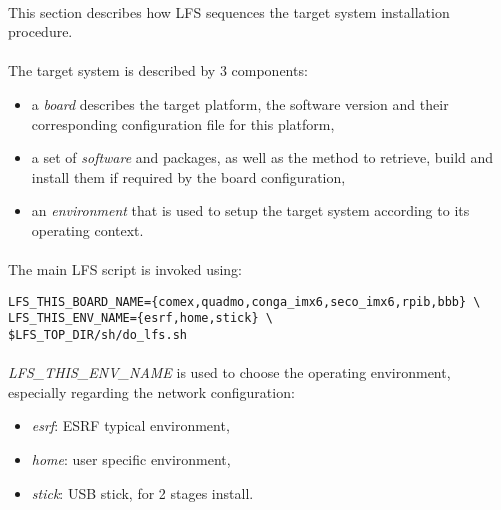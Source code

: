 \documentclass[a4paper, 11pt]{article}
\begin{document}
\paragraph{}
This section describes how LFS sequences the target system installation procedure.

\paragraph{}
The target system is described by 3 components:
\begin{itemize}
\item a \textit{board} describes the target platform, the software version and
their corresponding configuration file for this platform,
\item a set of \textit{software} and packages, as well as the method to retrieve,
build and install them if required by the board configuration,
\item an \textit{environment} that is used to setup the target system according
to its operating context.
\end{itemize}

\paragraph{}
The main LFS script is invoked using:\\

\begin{lstlisting}[frame=tb]
LFS_THIS_BOARD_NAME={comex,quadmo,conga_imx6,seco_imx6,rpib,bbb} \
LFS_THIS_ENV_NAME={esrf,home,stick} \
$LFS_TOP_DIR/sh/do_lfs.sh
\end{lstlisting}

\paragraph{}
\textit{LFS\_THIS\_ENV\_NAME} is used to choose the operating environment,
especially regarding the network configuration:
\begin{itemize}
\item \textit{esrf}: ESRF typical environment,
\item \textit{home}: user specific environment,
\item \textit{stick}: USB stick, for 2 stages install.
\end{itemize}
\end{document}
